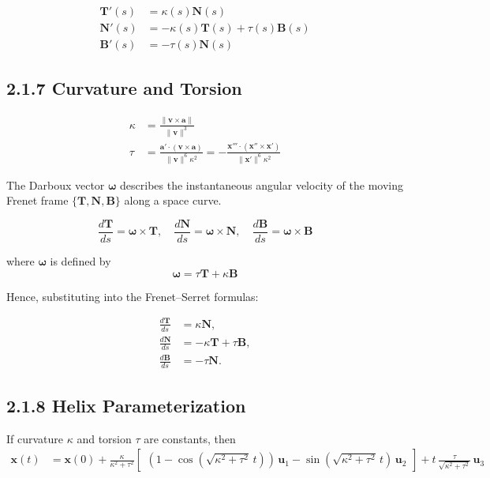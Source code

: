 \documentclass{article}
\begin{document}
\begin{align*}
    \mathbf{T}'(s) & = \kappa(s)\mathbf{N}(s)                         \\
    \mathbf{N}'(s) & = -\kappa(s)\mathbf{T}(s) + \tau(s)\mathbf{B}(s) \\
    \mathbf{B}'(s) & = -\tau(s)\mathbf{N}(s)
\end{align*}



\subsection*{2.1.7 Curvature and Torsion}

\begin{align*}
    \kappa & = \frac{\|\mathbf{v} \times \mathbf{a}\|}{\|\mathbf{v}\|^3}                          \\
    \tau   & = \frac{\mathbf{a}' \cdot (\mathbf{v} \times \mathbf{a})}{\|\mathbf{v}\|^6 \kappa^2}
    = -\frac{\mathbf{x}''' \cdot (\mathbf{x}'' \times \mathbf{x}')}{\|\mathbf{x}'\|^6 \kappa^2}
\end{align*}


The Darboux vector $\boldsymbol{\omega}$ describes the instantaneous angular velocity
of the moving Frenet frame $\{\mathbf{T}, \mathbf{N}, \mathbf{B}\}$ along a space curve.

\[
    \frac{d\mathbf{T}}{ds} = \boldsymbol{\omega} \times \mathbf{T}, \quad
    \frac{d\mathbf{N}}{ds} = \boldsymbol{\omega} \times \mathbf{N}, \quad
    \frac{d\mathbf{B}}{ds} = \boldsymbol{\omega} \times \mathbf{B}
\]

where $\boldsymbol{\omega}$ is defined by
\[
    \boldsymbol{\omega} = \tau \mathbf{T} + \kappa \mathbf{B}
\]

Hence, substituting into the Frenet–Serret formulas:

\begin{align}
    \frac{d\mathbf{T}}{ds} & = \kappa \mathbf{N},                    \\
    \frac{d\mathbf{N}}{ds} & = -\kappa \mathbf{T} + \tau \mathbf{B}, \\
    \frac{d\mathbf{B}}{ds} & = -\tau \mathbf{N}.
\end{align}

\subsection*{2.1.8 Helix Parameterization}

If curvature $\kappa$ and torsion $\tau$ are constants, then
\begin{align*}
    \mathbf{x}(t) & = \mathbf{x}(0)
    + \frac{\kappa}{\kappa^2 + \tau^2}
    \begin{bmatrix}
        (1 - \cos(\sqrt{\kappa^2 + \tau^2}\,t))\,\mathbf{u}_1
        - \sin(\sqrt{\kappa^2 + \tau^2}\,t)\,\mathbf{u}_2
    \end{bmatrix}
    + t\,\frac{\tau}{\sqrt{\kappa^2 + \tau^2}}\,\mathbf{u}_3
\end{align*}
\end{document}
